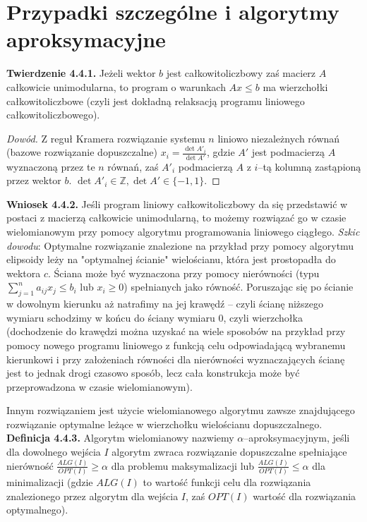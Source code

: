 \documentclass[licencjacka]{pracamgr}
\begin{document}
   \section{Przypadki szczególne i algorytmy aproksymacyjne}
\textbf{Twierdzenie 4.4.1.} Jeżeli wektor $b$ jest całkowitoliczbowy zaś macierz $A$ całkowicie unimodularna, to program o warunkach $Ax\le b$ ma wierzchołki całkowitoliczbowe
(czyli jest dokładną relaksacją programu liniowego całkowitoliczbowego).
\begin{proof}[Dowód]
Z reguł Kramera rozwiązanie systemu $n$ liniowo niezależnych równań (bazowe rozwiązanie dopuszczalne) $x_i=\frac{\det{A'_i}}{\det{A'}}$, gdzie $A'$ jest podmacierzą $A$ wyznaczoną
przez te $n$ równań, zaś $A'_i$ podmacierzą $A$ z $i$--tą kolumną zastąpioną przez wektor $b$. $\det{A'_i}\in\mathbb{Z},\det{A'}\in\{-1,1\}$.
\end{proof}
\noindent
\textbf{Wniosek 4.4.2.} Jeśli program liniowy całkowitoliczbowy da się przedstawić w postaci z macierzą całkowicie unimodularną,
to możemy rozwiązać go w czasie wielomianowym przy pomocy algorytmu programowania liniowego ciągłego.\newline\newline
%
\textit{Szkic dowodu}: Optymalne rozwiązanie znalezione na przykład przy pomocy algorytmu elipsoidy leży na "optymalnej ścianie" wielościanu, która jest prostopadła do wektora $c$.
Ściana może być wyznaczona przy pomocy nierówności (typu $\sum\limits_{j=1}^{n}a_{ij}x_j\le b_i$ lub $x_i\ge0$) spełnianych jako równość.
Poruszając się po ścianie w dowolnym kierunku aż natrafimy na jej krawędź -- czyli ścianę niższego wymiaru schodzimy w końcu do ściany wymiaru 0, czyli wierzchołka 
(dochodzenie do krawędzi można uzyskać na wiele sposobów na przykład przy pomocy nowego programu liniowego z funkcją celu odpowiadającą wybranemu kierunkowi
i przy założeniach równości dla nierówności wyznaczających ścianę jest to jednak drogi czasowo sposób, lecz cała konstrukcja może być przeprowadzona w czasie wielomianowym).

Innym rozwiązaniem jest użycie wielomianowego algorytmu zawsze znajdującego rozwiązanie optymalne leżące w wierzchołku wielościanu dopuszczalnego.\newline\newline
%
\textbf{Definicja 4.4.3.} Algorytm wielomianowy nazwiemy $\alpha$--aproksymacyjnym, jeśli dla dowolnego wejścia $I$ algorytm zwraca rozwiązanie dopuszczalne spełniające nierówność
$\frac{ALG(I)}{OPT(I)}\ge\alpha$ dla problemu maksymalizacji lub $\frac{ALG(I)}{OPT(I)}\le\alpha$ dla minimalizacji
(gdzie $ALG(I)$ to wartość funkcji celu dla rozwiązania znalezionego przez algorytm dla wejścia $I$, zaś $OPT(I)$ wartość dla rozwiązania optymalnego).\newline
\end{document}
